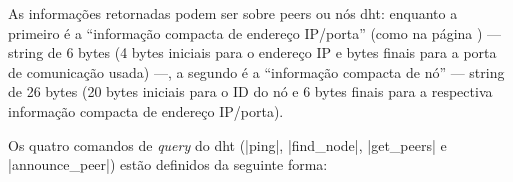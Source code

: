 As informações retornadas podem ser sobre \glspl*{peer} ou nós \gls*{dht}: enquanto a
primeiro é a \enquote{informação compacta de endereço IP/porta} (como na página
\pageref{par:compact}) --- string de 6 bytes (4 bytes iniciais para o endereço IP e
bytes finais para a porta de comunicação usada) ---, a segundo é a
\enquote{informação compacta de nó} --- string de 26 bytes (20 bytes iniciais para o ID
do nó e 6 bytes finais para a respectiva informação compacta de endereço IP/porta).

Os quatro comandos de \emph{query} do \gls*{dht} (\sverb|ping|, \sverb|find_node|,
\sverb|get_peers| e \sverb|announce_peer|) estão definidos da seguinte forma:








